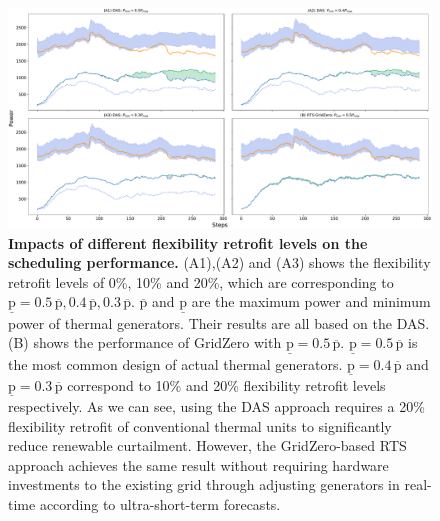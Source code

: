\begin{figure}[h]
  \centering
  \includegraphics[width=1.0\linewidth]{fig/flexibility_retrofit.pdf}
  \caption{\textbf{Impacts of different flexibility retrofit levels on the scheduling performance.} 
  (A1),(A2) and (A3) shows the flexibility retrofit levels of 
  0\%, 10\% and 20\%, which are corresponding to $\underline{\text{p}}=0.5\,\overline{\text{p}}, 0.4\,\overline{\text{p}}, 0.3\,\overline{\text{p}}$. $\overline{\text{p}}$ and $\underline{\text{p}}$ are the maximum power and minimum power of thermal generators.
  Their results are all based on the DAS. (B) shows the performance of GridZero with $\underline{\text{p}}=0.5\,\overline{\text{p}}$. $\underline{\text{p}}=0.5\,\overline{\text{p}}$ is the most common design of actual thermal generators. $\underline{\text{p}}=0.4\,\overline{\text{p}}$ and $\underline{\text{p}}=0.3\,\overline{\text{p}}$ correspond to 10\% and 20\% flexibility retrofit levels respectively. As we can see, using the DAS approach requires a 20\% flexibility retrofit of conventional thermal units to significantly reduce renewable curtailment. However, the GridZero-based RTS approach achieves the same result without requiring hardware investments to the existing grid through adjusting generators in real-time according to ultra-short-term forecasts.
  } 
  \label{fig:flexibility_retrofit}
\end{figure}

